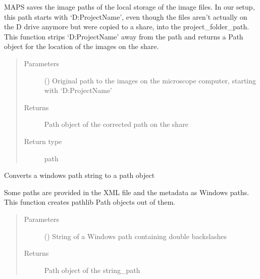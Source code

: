 \documentclass[letterpaper,10pt,english]{sphinxmanual}
\begin{document}
\begin{fulllineitems}
\begin{fulllineitems}
MAPS saves the image paths of the local storage of the image files. In our setup, this path starts with
‘D:ProjectName’, even though the files aren’t actually on the D drive anymore but were copied to a share, into
the project\_folder\_path. This function strips ‘D:ProjectName’ away from the path and returns a Path object for
the location of the images on the share.
\begin{quote}\begin{description}
\item[{Parameters}] \leavevmode
{} () \textendash{} Original path to the images on the microscope computer, starting with ‘D:ProjectName’

\item[{Returns}] \leavevmode
Path object of the corrected path on the share

\item[{Return type}] \leavevmode
path

\end{description}\end{quote}

\end{fulllineitems}


\begin{fulllineitems}
\label{\detokenize{index:sites_of_interest_parser.MapsXmlParser.convert_windows_pathstring_to_path_object}}
Converts a windows path string to a path object

Some paths are provided in the XML file and the metadata as Windows paths. This function creates pathlib Path
objects out of them.
\begin{quote}\begin{description}
\item[{Parameters}] \leavevmode
{} () \textendash{} String of a Windows path containing double backslashes

\item[{Returns}] \leavevmode
Path object of the string\_path


\end{description}
\end{quote}
\end{fulllineitems}
\end{fulllineitems}
\end{document}
